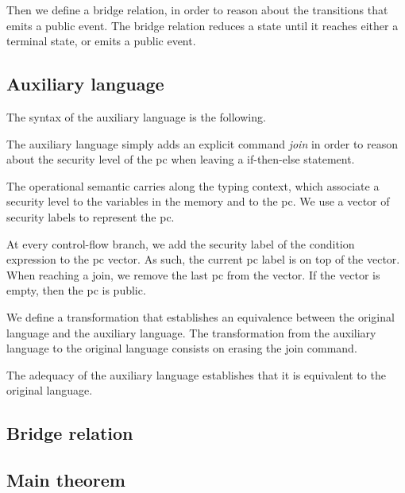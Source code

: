 \documentclass[10pt]{article}
\begin{document}
Then we define a bridge relation, in order to reason about the transitions that emits a public
event.
The bridge relation reduces a state until it reaches either a terminal state, or emits a public
event.

\subsection{Auxiliary language}%
\label{subsec:aux_lang}

The syntax of the auxiliary language is the following.

The auxiliary language simply adds an explicit command \emph{join} in order to reason about the
security level of the pc when leaving a if-then-else statement.

The operational semantic carries along the typing context, which associate a security level to the
variables in the memory and to the pc.
We use a vector of security labels to represent the pc.


At every control-flow branch, we add the security label of the condition expression to the pc
vector. As such, the current pc label is on top of the vector. When reaching a join, we remove the
last pc from the vector. If the vector is empty, then the pc is public.


We define a transformation that establishes an equivalence between the original language and the
auxiliary language.
The transformation from the auxiliary language to the original language consists on erasing the join
command.

The adequacy of the auxiliary language establishes that it is equivalent to the original language.

\subsection{Bridge relation}%
\label{subsec:brigde_rel}

\subsection{Main theorem}%
\label{subsec:main_theorem}
\end{document}
